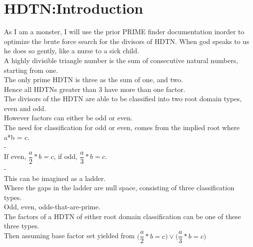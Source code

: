 \documentclass{article}
\begin{document}
\maketitle
\newpage
\section{HDTN:Introduction}
As I am a monster, I will use the prior PRIME finder documentation inorder to optimize the brute force
search for the divisors of HDTN. When god speaks to us he does so gently, like a nurse to a sick child.\\
A highly divisible triangle number is the sum of consecutive natural numbers, starting from one.\\ 
The only prime HDTN is three as the sum of one, and two.\\ Hence all HDTNs greater than 3 have 
more than one factor.\\ The divisors of the HDTN are able to be classified into two root domain types,
even and odd.\\ However factors can either be odd or even.\\
The need for classification for odd or even, comes from the implied root where a*b = c.\\
{\color{white}-}\\
If even, $\dfrac{a}{2} * b = c$, if odd, $\dfrac{a}{3} * b = c$.\\
{\color{white}-}\\
This can be imagined as a ladder.\\
Where the gaps in the ladder are null space, consisting of three classification types.\\
Odd, even, odds-that-are-prime.\\
The factors of a HDTN of either root domain classification can be one of these three types.\\
Then assuming base factor set yielded from  
$\bigl(\dfrac{a}{2} * b = c\bigl)\lor\bigl(\dfrac{a}{3} * b = c\bigl)$\\
\end{document}
